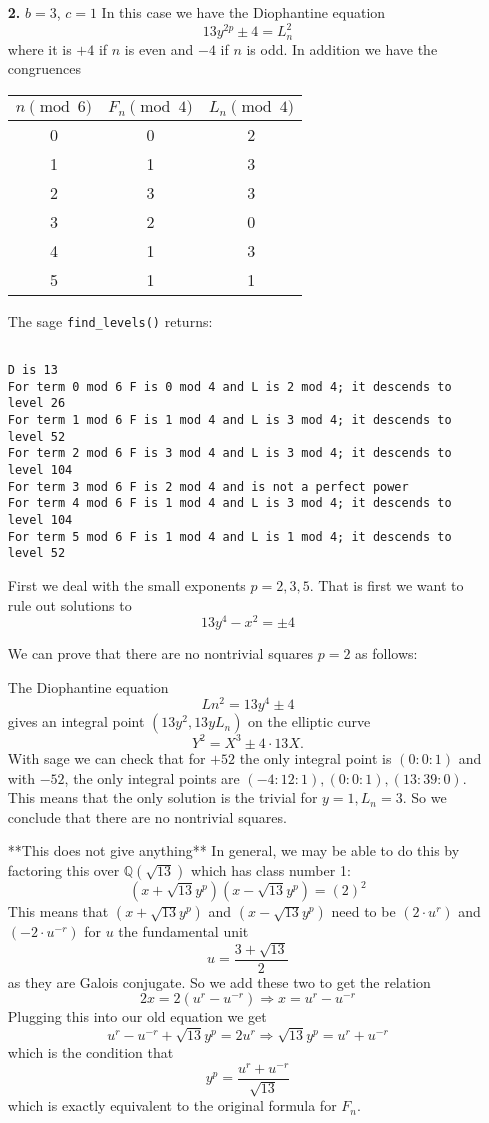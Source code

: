 \documentclass[12pt]{article}
\def\Q{{\mathbb Q}}
\begin{document}
 \begin{enumerate}
 
\item[\textbf{2.}] $b = 3$, $c = 1$
In this case we have the Diophantine equation
\[13y^{2p}  \pm 4 = L_n^2\]
where it is $+4$ if $n$ is even and $-4$ if $n$ is odd.  
In addition we have the congruences
\begin{center}
\begin{tabular}{c| c c}
$n \pmod{6}$ & $F_n \pmod{4}$ & $L_n \pmod{4}$ \\ \hline \hline
0 & 0 & 2 \\
1 & 1 &  3 \\
2 & 3 & 3 \\
3 & 2 & 0 \\
4 & 1 & 3 \\
5 & 1 & 1  \\ \hline \hline
\end{tabular}
\end{center}

The sage \texttt{find\_levels()} returns:

\begin{lstlisting}

D is 13
For term 0 mod 6 F is 0 mod 4 and L is 2 mod 4; it descends to level 26
For term 1 mod 6 F is 1 mod 4 and L is 3 mod 4; it descends to level 52
For term 2 mod 6 F is 3 mod 4 and L is 3 mod 4; it descends to level 104
For term 3 mod 6 F is 2 mod 4 and is not a perfect power
For term 4 mod 6 F is 1 mod 4 and L is 3 mod 4; it descends to level 104
For term 5 mod 6 F is 1 mod 4 and L is 1 mod 4; it descends to level 52

\end{lstlisting}

First we deal with the small exponents $p = 2,3,5$.  That is first we want to rule out solutions to
\[ 13y^{4} -x^{2} = \pm 4 \]


We can prove that there are no nontrivial squares $p=2$ as follows:

The Diophantine equation
\[ Ln^2 = 13y^4 \pm 4\]
gives an integral point $(13y^2, 13yL_n)$ on the elliptic curve
\[ Y^2 = X^3 \pm 4 \cdot 13 X .\]
With sage we can check that for $+52$ the only integral point is $(0:0:1)$ and with $-52$, the only integral points are $(-4:12:1), (0:0:1), (13:39:0)$.  This means that the only solution is the trivial for $y = 1, L_n = 3$.   So we conclude that there are no nontrivial squares.


**This does not give anything** In general, we may be able to do this by factoring this over $\Q(\sqrt{13})$ which has class number 1:
\[ (x + \sqrt{13} y^p)(x - \sqrt{13}y^p) = (2)^2 \]
This means that $(x+\sqrt{13}y^p)$ and $(x-\sqrt{13}y^p)$ need to be $(2 \cdot u^r)$ and $(-2 \cdot u^{-r})$ for $u$ the fundamental unit 
\[ u = \frac{3 + \sqrt{13}}{2} \]
as they are Galois conjugate.  So we add these two to get the relation
\[2x = 2(u^r-u^{-r}) \Rightarrow x = u^r-u^{-r} \]
Plugging this into our old equation we get
\[u^r - u^{-r} + \sqrt{13}y^p = 2u^r  \Rightarrow \sqrt{13}y^p = u^r + u^{-r}\]
which is the condition that
\[ y^p = \frac{u^r + u^{-r}}{\sqrt{13}} \]
which is exactly equivalent to the original formula for $F_n$.


\end{enumerate}
\end{document}
